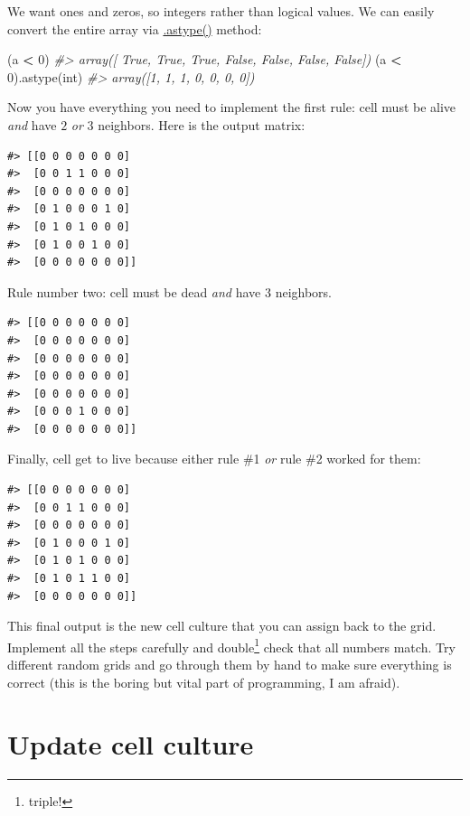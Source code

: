 \documentclass[
]{book}
\newenvironment{Shaded}{\begin{snugshade}}{\end{snugshade}}
\newcommand{\BuiltInTok}[1]{#1}
\newcommand{\CommentTok}[1]{\textcolor[rgb]{0.56,0.35,0.01}{\textit{#1}}}
\newcommand{\DecValTok}[1]{\textcolor[rgb]{0.00,0.00,0.81}{#1}}
\newcommand{\NormalTok}[1]{#1}
\newcommand{\OperatorTok}[1]{\textcolor[rgb]{0.81,0.36,0.00}{\textbf{#1}}}
\begin{document}
We want ones and zeros, so integers rather than logical values. We can easily convert the entire array via \href{https://numpy.org/doc/stable/reference/generated/numpy.ndarray.astype.html?highlight=astype}{.astype()} method:

\begin{Shaded}
\begin{Highlighting}[]
\NormalTok{(a }\OperatorTok{\textless{}} \DecValTok{0}\NormalTok{)}
\CommentTok{\#\textgreater{} array([ True,  True,  True, False, False, False, False])}
\NormalTok{(a }\OperatorTok{\textless{}} \DecValTok{0}\NormalTok{).astype(}\BuiltInTok{int}\NormalTok{)}
\CommentTok{\#\textgreater{} array([1, 1, 1, 0, 0, 0, 0])}
\end{Highlighting}
\end{Shaded}

Now you have everything you need to implement the first rule: cell must be alive \emph{and} have \(2\) \emph{or} \(3\) neighbors. Here is the output matrix:

\begin{verbatim}
#> [[0 0 0 0 0 0 0]
#>  [0 0 1 1 0 0 0]
#>  [0 0 0 0 0 0 0]
#>  [0 1 0 0 0 1 0]
#>  [0 1 0 1 0 0 0]
#>  [0 1 0 0 1 0 0]
#>  [0 0 0 0 0 0 0]]
\end{verbatim}

Rule number two: cell must be dead \emph{and} have \(3\) neighbors.

\begin{verbatim}
#> [[0 0 0 0 0 0 0]
#>  [0 0 0 0 0 0 0]
#>  [0 0 0 0 0 0 0]
#>  [0 0 0 0 0 0 0]
#>  [0 0 0 0 0 0 0]
#>  [0 0 0 1 0 0 0]
#>  [0 0 0 0 0 0 0]]
\end{verbatim}

Finally, cell get to live because either rule \#1 \emph{or} rule \#2 worked for them:

\begin{verbatim}
#> [[0 0 0 0 0 0 0]
#>  [0 0 1 1 0 0 0]
#>  [0 0 0 0 0 0 0]
#>  [0 1 0 0 0 1 0]
#>  [0 1 0 1 0 0 0]
#>  [0 1 0 1 1 0 0]
#>  [0 0 0 0 0 0 0]]
\end{verbatim}

This final output is the new cell culture that you can assign back to the grid. Implement all the steps carefully and double\footnote{triple!} check that all numbers match. Try different random grids and go through them by hand to make sure everything is correct (this is the boring but vital part of programming, I am afraid).

\hypertarget{update-cell-culture}{%
\section{Update cell culture}\label{update-cell-culture}}
\end{document}
